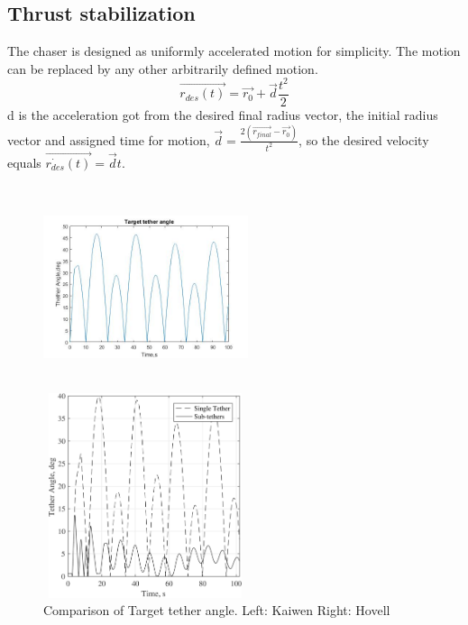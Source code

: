 \subsection{Thrust stabilization}
The chaser is designed as uniformly accelerated motion for simplicity. The motion can be replaced by any other arbitrarily defined motion.
\begin{equation}
\overrightarrow{r_{des}(t)}=\overrightarrow{r_0}+\overrightarrow{d}\frac{t^2}{2}
\end{equation} d is the acceleration got from the desired final radius vector, the initial radius vector and assigned time for motion, $\overrightarrow{d} = \frac{2(\overrightarrow{r_{final}}-\overrightarrow{r_0})}{t^2}$, so the desired velocity equals $\overrightarrow{\dot{r_{des}}(t)}=\overrightarrow{d}t$.
\begin{figure}[htbp]
\centering
\begin{minipage}[t]{0.48\textwidth}
\centering
\includegraphics[width=6cm,height=6cm]{fig/simulation/ThrustStable/Targettetherangle.jpg}
\end{minipage}
\begin{minipage}[t]{0.48\textwidth}
\centering
\includegraphics[width=6cm,height=6cm]{fig/simulation/ThrustStable/Targettetheranglesample.jpg}
\end{minipage}
\caption{Comparison of Target tether angle. Left: Kaiwen	Right: Hovell}
\end{figure}
